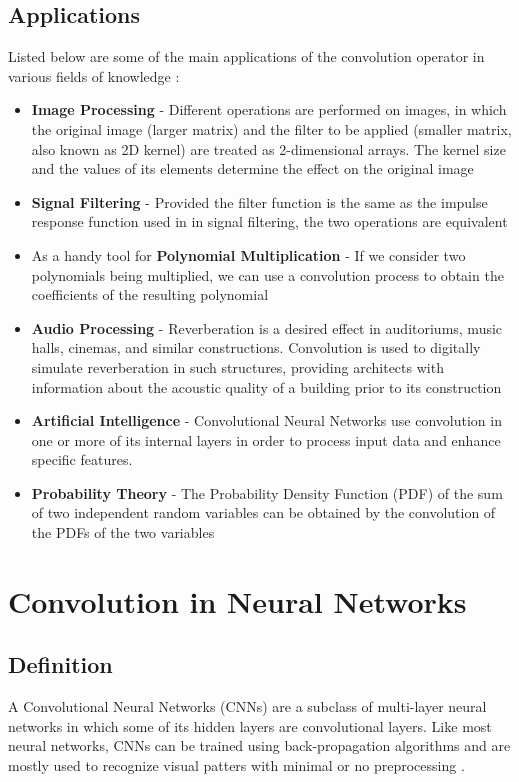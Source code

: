 \subsection{Applications}
\label{sec:convolution:mathematics:applications}
Listed below are some of the main applications of the convolution operator in various fields of knowledge \citep{Srivastava2013}:
\begin{itemize}
	\item \textbf{Image Processing} - Different operations are performed on images, in which the original image (larger matrix) and the filter to be applied (smaller matrix, also known as 2D kernel) are treated as 2-dimensional arrays. The kernel size and the values of its elements determine the effect on the original image
    \item \textbf{Signal Filtering} - Provided the filter function is the same as the impulse response function used in in signal filtering, the two operations are equivalent
    \item As a handy tool for \textbf{Polynomial Multiplication} - If we consider two polynomials being multiplied, we can use a convolution process to obtain the coefficients of the resulting polynomial
    \item \textbf{Audio Processing} - Reverberation is a desired effect in auditoriums, music halls, cinemas, and similar constructions. Convolution is used to digitally simulate reverberation in such structures, providing architects with information about the acoustic quality of a building prior to its construction
    \item \textbf{Artificial Intelligence} - Convolutional Neural Networks use convolution in one or more of its internal layers in order to process input data and enhance specific features.
    \item \textbf{Probability Theory} - The Probability Density Function (PDF) of the sum of two independent random variables can be obtained by the convolution of the PDFs of the two variables
\end{itemize}
\section{Convolution in Neural Networks}
\label{sec:convolution:convolutionalneuralnetworks}
\subsection{Definition}
\label{sec:convolution:convolutionalneuralnetworks:definition}
A Convolutional Neural Networks (CNNs) are a subclass of multi-layer neural networks in which some of its hidden layers are convolutional layers.\newline
Like most neural networks, CNNs can be trained using back-propagation algorithms and are mostly used to recognize visual patters with minimal or no preprocessing \citep{Lawrence1997A}.\newline
{}
